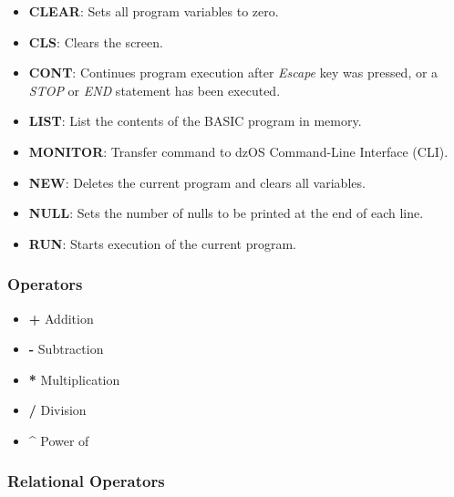         \begin{itemize}
            \item \textbf{CLEAR}: Sets all program variables to zero.
            \item \textbf{CLS}: Clears the screen.
            \item \textbf{CONT}: Continues program execution after \textit{Escape}
            key was pressed, or a \textit{STOP} or \textit{END} statement has
            been executed.
            \item \textbf{LIST}: List the contents of the BASIC program in memory.
            \item \textbf{MONITOR}: Transfer command to dzOS Command-Line
            Interface (CLI).
            \item \textbf{NEW}: Deletes the current program and clears all
            variables.
            \item \textbf{NULL}: Sets the number of nulls to be printed at the
            end of each line.
            \item \textbf{RUN}: Starts execution of the current program.
        \end{itemize}

        \subsubsection{Operators}

        \begin{itemize}
            \item \textbf{+} Addition
            \item \textbf{-} Subtraction
            \item \textbf{*} Multiplication
            \item \textbf{/} Division
            \item \textbf{\textasciicircum} Power of
        \end{itemize}

        \subsubsection{Relational Operators}

